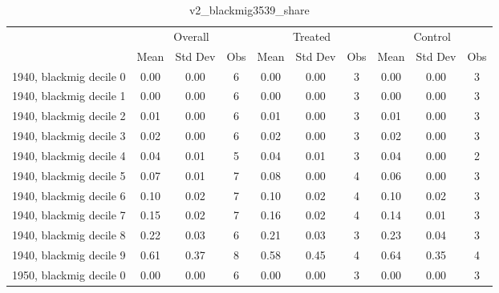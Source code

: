 \begin{table}[htbp]\centering
\def\sym#1{\ifmmode^{#1}\else\(^{#1}\)\fi}
\caption{v2\_blackmig3539\_share \label{tab1}}
\begin{tabular}{l*{3}{ccc}}
\toprule
                    &\multicolumn{3}{c}{Overall}           &\multicolumn{3}{c}{Treated}           &\multicolumn{3}{c}{Control}           \\
                    &        Mean&     Std Dev&         Obs&        Mean&     Std Dev&         Obs&        Mean&     Std Dev&         Obs\\
\midrule
1940, blackmig decile 0&        0.00&        0.00&           6&        0.00&        0.00&           3&        0.00&        0.00&           3\\
1940, blackmig decile 1&        0.00&        0.00&           6&        0.00&        0.00&           3&        0.00&        0.00&           3\\
1940, blackmig decile 2&        0.01&        0.00&           6&        0.01&        0.00&           3&        0.01&        0.00&           3\\
1940, blackmig decile 3&        0.02&        0.00&           6&        0.02&        0.00&           3&        0.02&        0.00&           3\\
1940, blackmig decile 4&        0.04&        0.01&           5&        0.04&        0.01&           3&        0.04&        0.00&           2\\
1940, blackmig decile 5&        0.07&        0.01&           7&        0.08&        0.00&           4&        0.06&        0.00&           3\\
1940, blackmig decile 6&        0.10&        0.02&           7&        0.10&        0.02&           4&        0.10&        0.02&           3\\
1940, blackmig decile 7&        0.15&        0.02&           7&        0.16&        0.02&           4&        0.14&        0.01&           3\\
1940, blackmig decile 8&        0.22&        0.03&           6&        0.21&        0.03&           3&        0.23&        0.04&           3\\
1940, blackmig decile 9&        0.61&        0.37&           8&        0.58&        0.45&           4&        0.64&        0.35&           4\\
1950, blackmig decile 0&        0.00&        0.00&           6&        0.00&        0.00&           3&        0.00&        0.00&           3\\

\end{tabular}
\end{table}
